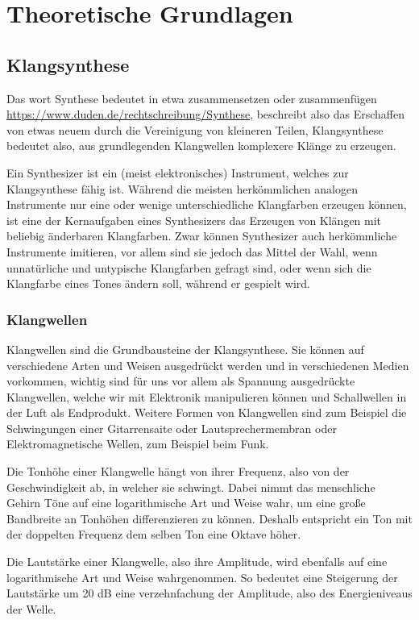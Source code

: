 \chapter{Theoretische Grundlagen}

\section{Klangsynthese}
\label{sec:orgd028b37}
Das wort Synthese bedeutet in etwa zusammensetzen oder zusammenfügen \url{https://www.duden.de/rechtschreibung/Synthese}, beschreibt also das Erschaffen von etwas neuem durch die Vereinigung von kleineren Teilen, Klangsynthese bedeutet also, aus grundlegenden Klangwellen komplexere Klänge zu erzeugen.

Ein Synthesizer ist ein (meist elektronisches) Instrument, welches zur Klangsynthese fähig ist. Während die meisten herkömmlichen analogen Instrumente nur eine oder wenige unterschiedliche Klangfarben erzeugen können, ist eine der Kernaufgaben eines Synthesizers das Erzeugen von Klängen mit beliebig änderbaren Klangfarben. Zwar können Synthesizer auch herkömmliche Instrumente imitieren, vor allem sind sie jedoch das Mittel der Wahl, wenn unnatürliche und untypische Klangfarben gefragt sind, oder wenn sich die Klangfarbe eines Tones ändern soll, während er gespielt wird.

\subsection{Klangwellen}
\label{sec:org8745516}
Klangwellen sind die Grundbausteine der Klangsynthese. Sie können auf verschiedene Arten und Weisen ausgedrückt werden und in verschiedenen Medien vorkommen, wichtig sind für uns vor allem als Spannung ausgedrückte Klangwellen, welche wir mit Elektronik manipulieren können und Schallwellen in der Luft als Endprodukt. Weitere Formen von Klangwellen sind zum Beispiel die Schwingungen einer Gitarrensaite oder Lautsprechermembran oder Elektromagnetische Wellen, zum Beispiel beim Funk.

Die Tonhöhe einer Klangwelle hängt von ihrer Frequenz, also von der Geschwindigkeit ab, in welcher sie schwingt. Dabei nimmt das menschliche Gehirn Töne auf eine logarithmische Art und Weise wahr, um eine große Bandbreite an Tonhöhen differenzieren zu können. Deshalb entspricht ein Ton mit der doppelten Frequenz dem selben Ton eine Oktave höher.

Die Lautstärke einer Klangwelle, also ihre Amplitude, wird ebenfalls auf eine logarithmische Art und Weise wahrgenommen. So bedeutet eine Steigerung der Lautstärke um 20 \si{\dB} eine verzehnfachung der Amplitude, also des Energieniveaus der Welle.

